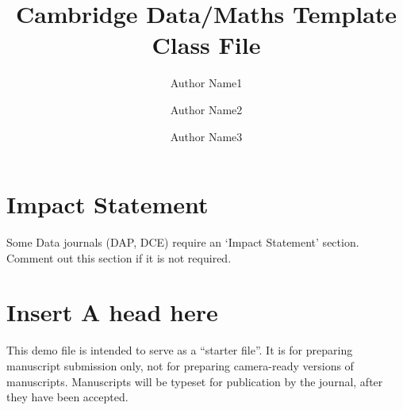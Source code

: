 \documentclass[journal=gmj]{CUP-JNL-DTM}%
\theoremstyle{definition}
\numberwithin{equation}{section}
\begin{document}
\begin{Frontmatter}

\title[Article Title]{Cambridge Data/Maths Template Class File}

\author[1]{Author Name1}
\author[2]{Author Name2}
\author[2]{Author Name3}


\address[1]{, , }

\address[2]{, , . }





\end{Frontmatter}

\section*{Impact Statement}
Some Data journals (DAP, DCE) require an `Impact Statement' section. Comment out this section if it is not required.

\localtableofcontents

\section{Insert A head here}
This demo file is intended to serve as a ``starter file''. It is for preparing manuscript submission only, not for preparing camera-ready versions of manuscripts. Manuscripts will be typeset for publication by the journal, after they have been accepted.
\end{document}
